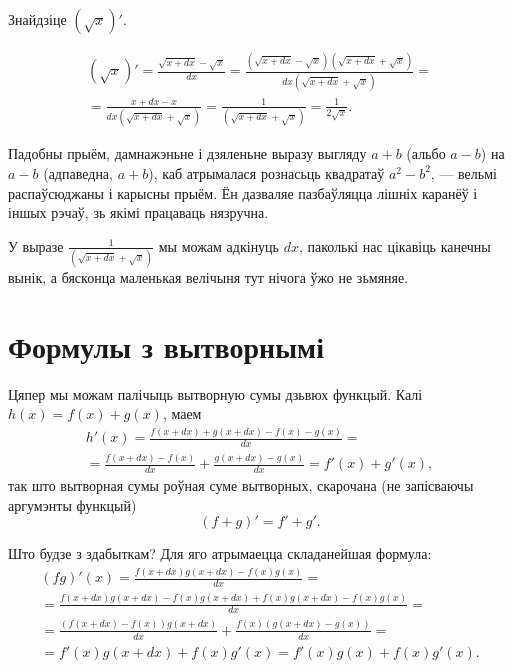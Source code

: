 \documentclass[10pt,a4paper]{book}
\theoremstyle{plain}
\begin{document}
\begin{exercise}
  Знайдзіце $(\sqrt{x})'$.
\end{exercise}
\begin{solution}
  \begin{multline*}
    (\sqrt{x})' = \frac{\sqrt{x+dx} - \sqrt{x}}{dx} = \frac{(\sqrt{x+dx} -
      \sqrt{x})(\sqrt{x+dx} + \sqrt{x})}{dx(\sqrt{x+dx} + \sqrt{x})} = \\ =
    \frac{x + dx - x}{dx(\sqrt{x+dx} + \sqrt{x})} = \frac{1}{(\sqrt{x+dx} +
      \sqrt{x})} = \frac{1}{2\sqrt{x}}.
  \end{multline*}

  Падобны прыём, дамнажэньне і дзяленьне выразу выгляду $a + b$ (альбо $a - b$)
  на $a - b$ (адпаведна, $a + b$), каб атрымалася рознасьць квадратаў $a^2 -
  b^2$, --- вельмі распаўсюджаны і карысны прыём. Ён дазваляе пазбаўляцца лішніх
  каранёў і іншых рэчаў, зь якімі працаваць нязручна.

  У выразе $\frac{1}{(\sqrt{x+dx} + \sqrt{x})}$ мы можам адкінуць $dx$, паколькі
  нас цікавіць канечны вынік, а бясконца маленькая велічыня тут нічога ўжо не
  зьмяняе.
\end{solution}


\section{Формулы з вытворнымі}

Цяпер мы можам палічыць вытворную сумы дзьвюх функцый. Калі $h(x) = f(x) +
g(x)$, маем
\begin{multline*}
  h'(x) = \frac{f(x+dx) + g(x+dx) - f(x) - g(x)}{dx} = \\ = \frac{f(x+dx) - f(x)}{dx}
  + \frac{g(x+dx) - g(x)}{dx} = f'(x) + g'(x),
\end{multline*}
так што вытворная сумы роўная суме вытворных, скарочана (не запісваючы аргумэнты
функцый)
\begin{equation*}
  (f + g)' = f' + g'.
\end{equation*}

Што будзе з здабыткам? Для яго атрымаецца складанейшая формула:
\begin{multline*}
  (fg)'(x) = \frac{f(x+dx)g(x+dx) - f(x)g(x)}{dx} = \\ = \frac{f(x+dx)g(x+dx) -
    f(x)g(x+dx) + f(x)g(x+dx)- f(x)g(x)}{dx} = \\ = \frac{(f(x+dx) -
    f(x))g(x+dx)}{dx} + \frac{f(x)(g(x+dx) - g(x))}{dx} = \\ = f'(x)g(x+dx) +
  f(x)g'(x) = f'(x)g(x) + f(x)g'(x).
\end{multline*}\
\end{document}
